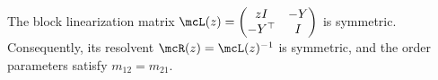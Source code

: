 \begin{lemma}\label{lem:symmetry}
The block linearization matrix $\mcL(z) = \begin{pmatrix} zI & -Y \\ -Y^\top & I \end{pmatrix}$ is symmetric. Consequently, its resolvent $\mcR(z) = \mcL(z)^{-1}$ is symmetric, and the order parameters satisfy $m_{12} = m_{21}$.
\end{lemma}
